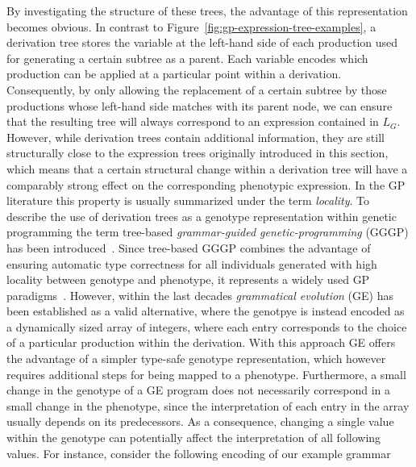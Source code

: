By investigating the structure of these trees, the advantage of this representation becomes obvious.
In contrast to Figure~\ref{fig:gp-expression-tree-examples}, a derivation tree stores the variable at the left-hand side of each production used for generating a certain subtree as a parent.
Each variable encodes which production can be applied at a particular point within a derivation.
Consequently, by only allowing the replacement of a certain subtree by those productions whose left-hand side matches with its parent node, we can ensure that the resulting tree will always correspond to an expression contained in $L_G$. 
However, while derivation trees contain additional information, they are still structurally close to the expression trees originally introduced in this section, which means that a certain structural change within a derivation tree will have a comparably strong effect on the corresponding phenotypic expression.
In the GP literature this property is usually summarized under the term \emph{locality}.
To describe the use of derivation trees as a genotype representation within genetic programming the term tree-based \emph{grammar-guided genetic-programming} (GGGP) has been introduced~\cite{mckay2010grammar,whigham1995grammatically}.
Since tree-based GGGP combines the advantage of ensuring automatic type correctness for all individuals generated with high locality between genotype and phenotype, it represents a widely used GP paradigms~\cite{mckay2010grammar}.
However, within the last decades \emph{grammatical evolution} (GE) has been established as a valid alternative, where the genotpye is instead encoded as a dynamically sized array of integers, where each entry corresponds to the choice of a particular production within the derivation.
With this approach GE offers the advantage of a simpler type-safe genotype representation, which however requires additional steps for being mapped to a phenotype.
Furthermore, a small change in the genotype of a GE program does not necessarily correspond in a small change in the phenotype, since the interpretation of each entry in the array usually depends on its predecessors.
As a consequence, changing a single value within the genotype can potentially affect the interpretation of all following values.
For instance, consider the following encoding of our example grammar
